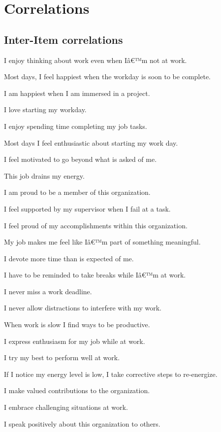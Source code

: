 \documentclass[
]{book}
\begin{document}
\hypertarget{corrs}{%
\chapter{Correlations}\label{corrs}}

\hypertarget{inter-item-correlations}{%
\section{Inter-Item correlations}\label{inter-item-correlations}}

I enjoy thinking about work even when Iâ€™m not at work.

Most days, I feel happiest when the workday is soon to be complete.

I am happiest when I am immersed in a project.

I love starting my workday.

I enjoy spending time completing my job tasks.

Most days I feel enthusiastic about starting my work day.

I feel motivated to go beyond what is asked of me.

This job drains my energy.

I am proud to be a member of this organization.

I feel supported by my supervisor when I fail at a task.

I feel proud of my accomplishments within this organization.

My job makes me feel like Iâ€™m part of something meaningful.

I devote more time than is expected of me.

I have to be reminded to take breaks while Iâ€™m at work.

I never miss a work deadline.

I never allow distractions to interfere with my work.

When work is slow I find ways to be productive.

I express enthusiasm for my job while at work.

I try my best to perform well at work.

If I notice my energy level is low, I take corrective steps to re-energize.

I make valued contributions to the organization.

I embrace challenging situations at work.

I speak positively about this organization to others.
\end{document}
